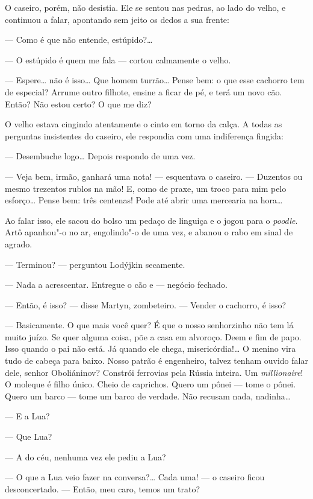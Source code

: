 O caseiro, porém, não desistia. Ele se sentou nas pedras, ao lado do
velho, e continuou a falar, apontando sem jeito os dedos a sua frente:

--- Como é que não entende, estúpido?\ldots{}

--- O estúpido é quem me fala --- cortou calmamente o velho.

--- Espere\ldots{} não é isso\ldots{} Que homem turrão\ldots{} Pense bem: o que esse
cachorro tem de especial? Arrume outro filhote, ensine a ficar de pé, e
terá um novo cão. Então? Não estou certo? O que me diz?

O velho estava cingindo atentamente o cinto em torno da calça. A todas
as perguntas insistentes do caseiro, ele respondia com uma indiferença
fingida:

--- Desembuche logo\ldots{} Depois respondo de uma vez.

--- Veja bem, irmão, ganhará uma nota! --- esquentava o caseiro. ---
Duzentos ou mesmo trezentos rublos na mão! E, como de praxe, um troco
para mim pelo esforço\ldots{} Pense bem: três centenas! Pode até abrir uma
mercearia na hora\ldots{}

Ao falar isso, ele sacou do bolso um pedaço de linguiça e o jogou para o
\emph{poodle}. Artô apanhou"-o no ar, engolindo"-o de uma vez, e abanou o
rabo em sinal de agrado.

--- Terminou? --- perguntou Lodýjkin secamente.

--- Nada a acrescentar. Entregue o cão e --- negócio fechado.

--- Então, é isso? --- disse Martyn, zombeteiro. --- Vender o cachorro,
é isso?

--- Basicamente. O que mais você quer? É que o nosso senhorzinho não tem
lá muito juízo. Se quer alguma coisa, põe a casa em alvoroço. Deem e fim
de papo. Isso quando o pai não está. Já quando ele chega,
misericórdia!\ldots{} O menino vira tudo de cabeça para baixo. Nosso patrão é
engenheiro, talvez tenham ouvido falar dele, senhor Oboliáninov?
Constrói ferrovias pela Rússia inteira. Um \emph{millionaire}! O moleque
é filho único. Cheio de caprichos. Quero um pônei --- tome o pônei.
Quero um barco --- tome um barco de verdade. Não recusam nada,
nadinha\ldots{}

--- E a Lua?

--- Que Lua?

--- A do céu, nenhuma vez ele pediu a Lua?

--- O que a Lua veio fazer na conversa?\ldots{} Cada uma! --- o caseiro ficou
desconcertado. --- Então, meu caro, temos um trato?


